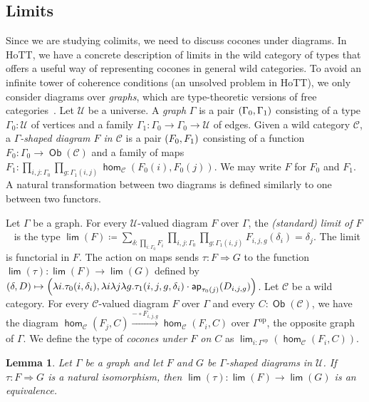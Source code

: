 \documentclass[10pt,a4paper]{article}
\newtheorem{lem}[thm]{Lemma}
\theoremstyle{definition}
\theoremstyle{remark}
\newcommand{\C}{\mathcal C}
\newcommand{\U}{\mathcal{U}}
\newcommand{\0}{\mathbf{0}}
\newcommand{\1}{\mathbf{1}}
\newcommand{\2}{\mathbf{2}}
\DeclareMathOperator{\ap}{\mathsf{ap}}
\DeclareMathOperator{\homm}{\mathsf{hom}}
\DeclareMathOperator{\op}{op}
\DeclareMathOperator{\limm}{\mathsf{lim}}
\DeclareMathOperator{\obb}{\mathsf{Ob}}
\begin{document}
\subsection*{Limits}

Since we are studying colimits, we need to discuss cocones under diagrams. In HoTT, we have a concrete description of limits in the wild category of types that offers a useful way of representing cocones in general wild categories.
To avoid an infinite tower of coherence conditions (an unsolved problem in HoTT), we only consider diagrams over \emph{graphs}, which are type-theoretic versions of free categories~\cite[Section 3.2]{CSL25}. Let $\U$ be a universe. A \emph{graph} $\Gamma$ is a pair $\mleft(\Gamma_0, \Gamma_1\mright)$ consisting of a type $\Gamma_0 : \U$ of vertices and a family $\Gamma_1 : \Gamma_0 \to \Gamma_0 \to \U$ of edges.
 Given a wild category $\C$, a \emph{$\Gamma$-shaped diagram $F$ in $\C$} is a pair $\mleft(F_0, F_1\mright)$ consisting of a function $F_0 : \Gamma_0 \to \obb(\C)$ and a family of maps $F_1 : \prod_{i,j : \Gamma_0}\prod_{g : \Gamma_1(i,j)}  \homm_{\C}(F_0(i) , F_0(j))$. We may write $F$ for $F_0$ and $F_1$. A natural transformation between two diagrams is defined similarly to one between two functors.

Let $\Gamma$ be a graph. For every $\U$-valued diagram $F$ over $\Gamma$, the \emph{(standard) limit of $F$}~\cite[Definition 4.2.7]{Avi} is the type $\limm(F)  \coloneqq \sum_{\delta : \prod_{i : \Gamma_0}F_i}\prod_{i,j : \Gamma_0}\prod_{g : \Gamma_1(i,j)} F_{i,j,g}(\delta_i) = \delta_j$. The limit is functorial in $F$. The action on maps sends $\tau : F \Rightarrow G$ to the function $\limm(\tau) : \limm(F) \to \limm(G)$ defined by $\mleft(\delta, D\mright) \mapsto \mleft(\lambda{i}.\tau_0(i, \delta_i), \lambda{i}\lambda{j}\lambda{g}.\tau_1(i,j,g, \delta_i) \cdot \ap_{\tau_0(j)}(D_{i,j,g}) \mright)$.
Let $\C$ be a wild category. For every $\C$-valued diagram $F$ over $\Gamma$ and every $C : \obb(\C)$, we have the diagram $\homm_{\C}(F_j, C) \xrightarrow{{-} \circ F_{i,j,g}} \homm_{\C}(F_i, C)$ over $\Gamma^{\op}$, the opposite graph of $\Gamma$. We define the type of \emph{cocones under $F$ on $C$} as $\limm_{i : \Gamma^{\op}}(\homm_{\C}(F_i , C))$.
\begin{lem} \label{limpreseq}
Let $\Gamma$ be a graph and let $F$ and $G$ be $\Gamma$-shaped diagrams in $\U$. If $\tau : F \Rightarrow G$ is a natural isomorphism, then $\limm(\tau) : \limm(F) \to \limm(G)$ is an equivalence. 
\end{lem}
\end{document}

